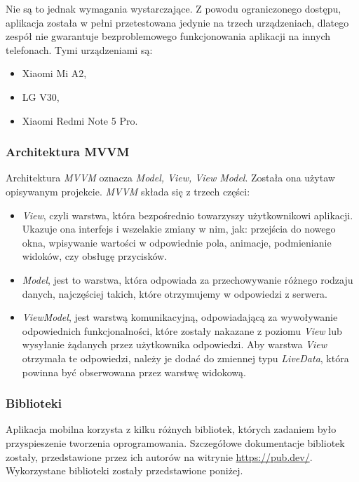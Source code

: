 \documentclass[twoside]{projektInzynierskiMS}
\numberwithin{figure}{section}
\begin{document}
Nie są to jednak wymagania wystarczające. Z powodu ograniczonego dostępu, aplikacja została w pełni przetestowana jedynie na trzech urządzeniach, dlatego zespół nie gwarantuje bezproblemowego funkcjonowania aplikacji na innych telefonach. \newline
Tymi urządzeniami są:
\begin{itemize}
    \item Xiaomi Mi A2,
    \item LG V30,
    \item Xiaomi Redmi Note 5 Pro.
\end{itemize}
\subsubsection{Architektura MVVM}
Architektura \textit{MVVM} oznacza \textit{Model, View, View Model}. Została ona użyta\linebreak w opisywanym projekcie. \textit{MVVM} składa się z trzech części:
\begin{itemize}
    \item \textit{View}, czyli warstwa, która bezpośrednio towarzyszy użytkownikowi aplikacji. Ukazuje ona interfejs i wszelakie zmiany w nim, jak: przejścia do nowego okna, wpisywanie wartości w odpowiednie pola, animacje, podmienianie widoków, czy obsługę przycisków.
    \item \textit{Model}, jest to warstwa, która odpowiada za przechowywanie różnego rodzaju danych, najczęściej takich, które otrzymujemy w odpowiedzi z serwera.
    \item \textit{ViewModel}, jest warstwą komunikacyjną, odpowiadającą za wywoływanie odpowiednich funkcjonalności, które zostały nakazane z poziomu \textit{View} lub wysyłanie żądanych przez użytkownika odpowiedzi. Aby warstwa \textit{View} otrzymała te odpowiedzi, należy je dodać do zmiennej typu \textit{LiveData}, która powinna być obserwowana przez warstwę widokową.
\end{itemize}

\subsubsection{Biblioteki}
Aplikacja mobilna korzysta z kilku różnych bibliotek, których zadaniem było przyspieszenie tworzenia oprogramowania. Szczegółowe dokumentacje bibliotek zostały, przedstawione przez ich autorów na witrynie \url{https://pub.dev/}. Wykorzystane biblioteki zostały przedstawione poniżej.
\end{document}
